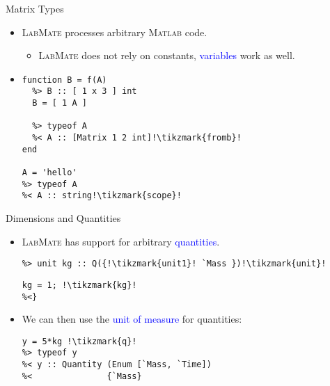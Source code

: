 \documentclass[]{beamer}
\newcommand{\tikzmark}[1]{\tikz[overlay,remember picture,baseline=-0.5ex] \node (#1) {};}
\newcommand{\keyword}[1]{\textcolor{blue}{#1}}
\newcommand{\lm}{\textsc{LabMate}\xspace}
\newcommand{\ma}{\textsc{Matlab}\xspace}
\begin{document}
\begin{frame}[fragile]{Matrix Types}
  \begin{itemize}[<+->]
  \item \lm processes arbitrary \ma code.
    \smallskip
    \begin{itemize}[<.->]
    \item \lm does not rely on constants, \keyword{variables} work as well.
    \end{itemize}
  \item
    \begin{lstlisting}[xleftmargin=0em]
function B = f(A)
  %> B :: [ 1 x 3 ] int
  B = [ 1 A ]

  %> typeof A
  %< A :: [Matrix 1 2 int]!\tikzmark{fromb}!
end

A = 'hello'
%> typeof A
%< A :: string!\tikzmark{scope}!
     \end{lstlisting}
  \end{itemize}
\end{frame}

\begin{frame}[fragile]{Dimensions and Quantities}
  \begin{itemize}[<+->]
  \item \lm has support for arbitrary \keyword{quantities}.
    \begin{lstlisting}[xleftmargin=0em,belowskip=-1em]
%> dimensions V for Q over `Mass!\tikzmark{base}!, `Time
%> unit kg :: Q({!\tikzmark{unit1}! `Mass })!\tikzmark{unit}!
    \end{lstlisting}
    \pause
    \begin{lstlisting}[xleftmargin=0em]
%<{
kg = 1; !\tikzmark{kg}!
%<}
    \end{lstlisting}
    \pause
    \pause
  \item We can then use the \keyword{unit of measure} for quantities:
    \begin{lstlisting}[xleftmargin=0em]
y = 5*kg !\tikzmark{q}!
%> typeof y
%< y :: Quantity (Enum [`Mass, `Time])
%<               {`Mass}
   \end{lstlisting}
  \end{itemize}
\end{frame}
\end{document}

